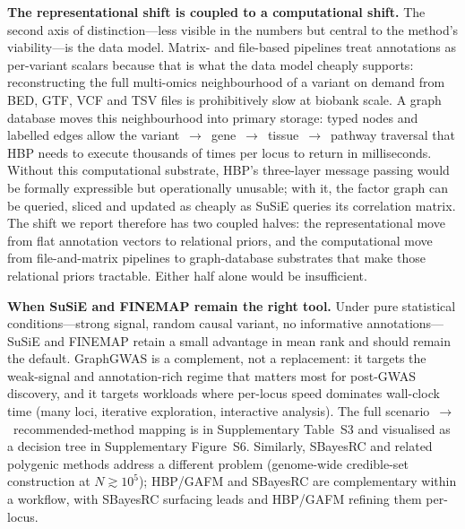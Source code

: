 \textbf{The representational shift is coupled to a computational
shift.} The second axis of distinction---less visible in the
numbers but central to the method's viability---is the data model.
Matrix- and file-based pipelines treat annotations as
per-variant scalars because that is what the data model cheaply
supports: reconstructing the full multi-omics neighbourhood of a
variant on demand from BED, GTF, VCF and TSV files is
prohibitively slow at biobank scale. A graph
database\cite{robinson2015graph} moves this neighbourhood into
primary storage: typed nodes and labelled edges allow the
variant~$\rightarrow$~gene~$\rightarrow$~tissue~$\rightarrow$~pathway traversal
that HBP needs to execute thousands of times per locus to return
in milliseconds. Without this computational substrate, HBP's
three-layer message passing would be formally expressible but
operationally unusable; with it, the factor graph can be queried,
sliced and updated as cheaply as SuSiE queries its correlation
matrix. The shift we report therefore has two coupled
halves: the representational move from flat annotation vectors to
relational priors, and the computational move from
file-and-matrix pipelines to graph-database substrates that make
those relational priors tractable. Either half alone would be
insufficient.

\textbf{When SuSiE and FINEMAP remain the right tool.} Under
pure statistical conditions---strong signal, random causal
variant, no informative annotations---SuSiE\cite{wang2020simple,zou2022fine}
and FINEMAP\cite{benner2016finemap} retain a small advantage in
mean rank\cite{hutchinson2020improving} and should remain the
default.
GraphGWAS is a complement, not a replacement: it targets the
weak-signal and annotation-rich regime that matters most for
post-GWAS discovery, and it targets workloads where per-locus
speed dominates wall-clock time (many loci, iterative
exploration, interactive analysis). The full
scenario~$\to$~recommended-method mapping is in Supplementary
Table~S3 and visualised as a decision tree in Supplementary
Figure~S6. Similarly, SBayesRC and
related polygenic methods address a different problem
(genome-wide credible-set construction at $N \gtrsim 10^5$);
HBP/GAFM and SBayesRC are complementary within a workflow, with
SBayesRC surfacing leads and HBP/GAFM refining them per-locus.

